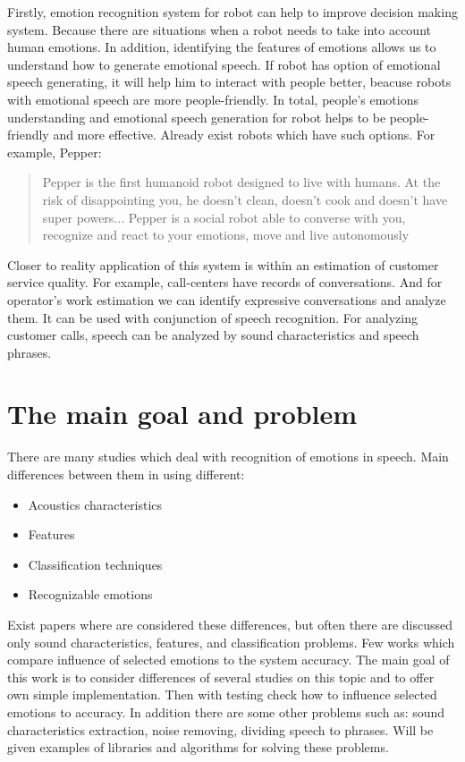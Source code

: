 \documentclass[12pt, letterpaper]{article}
\begin{document}
Firstly, emotion recognition system for robot can help to improve decision making system. Because there are situations when a robot needs to take into account human emotions. In addition, identifying the features of emotions allows us to understand how to generate emotional speech. If robot has option of emotional speech generating, it will help him to interact with people better, beacuse robots with emotional speech are more people-friendly. In total, people's emotions understanding and emotional speech generation for robot helps to be people-friendly and more effective. Already exist robots which have such options. For example, Pepper:
\begin{quote}
	Pepper is the first humanoid robot designed to live with humans. At the risk of disappointing you, he doesn't clean, doesn't cook and doesn't have super powers... Pepper is a social robot able to converse with you, recognize and react to your emotions, move and live autonomously\cite{pepper}
\end{quote}
Closer to reality application of this system is within an estimation of customer service quality. For example, call-centers have records of conversations. And for operator's work estimation we can identify expressive conversations and analyze them. It can be used with conjunction of speech recognition. For analyzing customer calls, speech can be analyzed by sound characteristics and speech phrases.

\section{The main goal and problem}

There are many studies which deal with recognition of emotions in speech. Main differences between them in using different:
\begin{itemize}
	\item Acoustics characteristics
	\item Features
	\item Classification techniques
	\item Recognizable emotions
\end{itemize}

Exist papers where are considered these differences, but often there are discussed only sound characteristics, features, and classification problems. Few works which compare influence of selected emotions to the system accuracy. The main goal of this work is to consider differences of several studies on this topic and to offer own simple implementation. Then with testing check how to influence selected emotions to accuracy.
In addition there are some other problems such as: sound characteristics extraction, noise removing, dividing speech to phrases. Will be given examples of libraries and algorithms for solving these problems.
\end{document}
